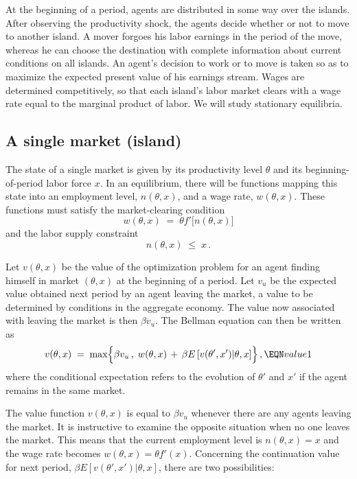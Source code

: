 At the beginning of a period, agents are distributed in some
way over the islands. After observing the productivity shock, the
agents decide whether or not to move to another island. A mover
forgoes his labor earnings in the period of the move, whereas he
can choose the destination with complete information about
current conditions on all islands. An agent's decision to work or to move
is taken so as to maximize the expected
present value of his earnings stream. Wages are determined
competitively, so that each island's labor market clears with
a wage rate equal to the marginal product of labor.
We will study stationary equilibria.


\subsection{A single market (island)}

The state of a single market is given by its productivity level
$\theta$ and its beginning-of-period labor force $x$. In an
equilibrium, there will be functions mapping this state into
an employment level, $n(\theta, x)$, and a wage rate,
$w(\theta, x)$. These functions must satisfy the market-clearing
condition
$$w(\theta, x) \;=\; \theta f'\bigl[ n(\theta, x) \bigr]   $$
and the labor supply constraint
$$n(\theta, x) \;\leq\; x \,.
$$

Let $v(\theta, x)$ be the value of the optimization problem
for an agent finding himself in market $(\theta, x)$ at the
beginning of a period. Let $v_u$ be the expected value obtained
next period by an agent leaving the market, a value to be
determined by conditions in the aggregate economy.
The value now associated with leaving the
market is then $\beta v_u$.
 The Bellman equation can then be
written as
$$v(\theta, x) \;=\; \max \Bigl\{\beta v_u \,,\; w(\theta, x) \,+\,
   \beta E\left[v(\theta',x') \vert \theta, x \right]
                                                     \Bigr\}\,, \EQN value1
$$
where the conditional expectation refers to the evolution of
$\theta'$ and $x'$ if the agent remains in the same market.


The value function $v(\theta, x)$ is equal to $\beta v_u$ whenever
there are any agents leaving the market. It is instructive to
examine the opposite situation when no one leaves the market.
This means that the current employment level is
$n(\theta, x) = x$ and the wage rate becomes
$w(\theta, x) = \theta f'(x)$. Concerning the continuation
value for next period,
$\beta E\left[v(\theta',x') \vert \theta, x \right]$, there
are two possibilities:

